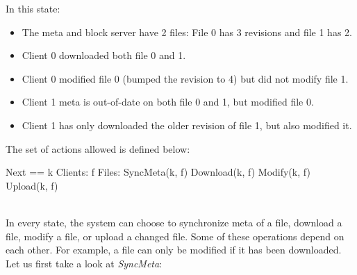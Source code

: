 In this state:
\begin{itemize}
    \item The meta and block server have 2 files: File 0 has 3 revisions and file 1 has 2.
    \item Client 0 downloaded both file 0 and 1.
    \item Client 0 modified file 0 (bumped the revision to 4) but did not modify file 1.
    \item Client 1 meta is out-of-date on both file 0 and 1, but modified file 0.
    \item Client 1 has only downloaded the older revision of file 1, but also modified it.
\end{itemize}

The set of actions allowed is defined below:\\
\begin{tla}
Next ==
    \/ \E k \in Clients: 
        \E f \in Files: 
            \/ SyncMeta(k, f)
            \/ Download(k, f)
            \/ Modify(k, f)
            \/ Upload(k, f)
\end{tla}
\begin{tlatex}
%
%
%
%
%
%
%
\end{tlatex}
\\

In every state, the system can choose to synchronize meta of a file, download a
file, modify a file, or upload a changed file. Some of these operations depend
on each other. For example, a file can only be modified if it has been
downloaded.\\ 

Let us first take a look at \textit{SyncMeta}:\\

